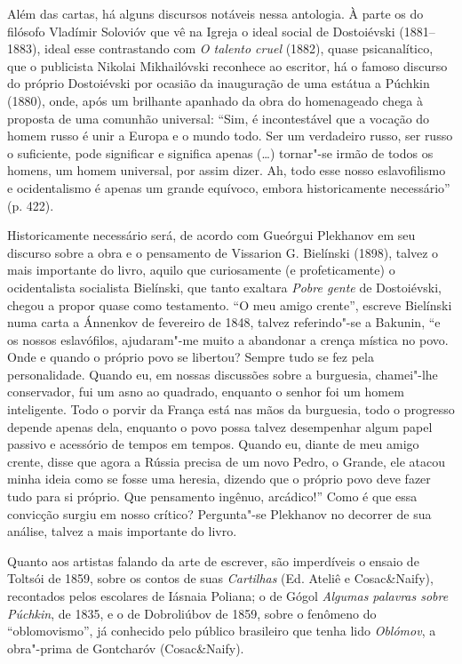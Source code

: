 Além das cartas, há alguns discursos notáveis nessa antologia. À parte
os do filósofo Vladímir Solovióv que vê na Igreja o ideal social de
Dostoiévski (1881--1883), ideal esse contrastando com \emph{O talento
cruel} (1882), quase psicanalítico, que o publicista Nikolai Mikhailóvski reconhece
ao escritor, há o famoso discurso do próprio Dostoiévski por ocasião da
inauguração de uma estátua a Púchkin (1880), onde, após um brilhante
apanhado da obra do homenageado chega à proposta de uma comunhão
universal: ``Sim, é incontestável que a vocação do homem russo é unir a
Europa e o mundo todo. Ser um verdadeiro russo, ser russo o suficiente,
pode significar e significa apenas (\ldots{}) tornar"-se irmão de todos os
homens, um homem universal, por assim dizer. Ah, todo esse nosso
eslavofilismo e ocidentalismo é apenas um grande equívoco, embora
historicamente necessário'' (p. 422).

Historicamente necessário será, de acordo com Gueórgui Plekhanov em seu
discurso sobre a obra e o pensamento de Vissarion G. Bielínski (1898),
talvez o mais importante do livro, aquilo que curiosamente (e
profeticamente) o ocidentalista socialista Bielínski, que tanto
exaltara \emph{Pobre gente} de Dostoiévski, chegou a propor quase como
testamento. ``O meu amigo crente'', escreve Bielínski numa carta a
Ánnenkov de fevereiro de 1848, talvez referindo"-se a Bakunin, ``e os
nossos eslavófilos, ajudaram"-me muito a abandonar a crença mística no
povo. Onde e quando o próprio povo se libertou? Sempre tudo se fez pela
personalidade. Quando eu, em nossas discussões sobre a burguesia,
chamei"-lhe conservador, fui um asno ao quadrado, enquanto o senhor foi
um homem inteligente. Todo o porvir da França está nas mãos da
burguesia, todo o progresso depende apenas dela, enquanto o povo possa
talvez desempenhar algum papel passivo e acessório de tempos em tempos.
Quando eu, diante de meu amigo crente, disse que agora a Rússia precisa
de um novo Pedro, o Grande, ele atacou minha ideia como se fosse uma
heresia, dizendo que o próprio povo deve fazer tudo para si próprio. Que
pensamento ingênuo, arcádico!'' Como é que essa convicção surgiu em
nosso crítico? Pergunta"-se Plekhanov no decorrer de sua
análise, talvez a mais importante do livro.

Quanto aos artistas falando da arte de escrever, são imperdíveis o
ensaio de Toltsói de 1859, sobre os contos de suas \emph{Cartilhas} (Ed.
Ateliê e Cosac\&Naify), recontados pelos escolares de Iásnaia Poliana; o
de Gógol \emph{Algumas palavras sobre Púchkin}, de 1835, e o de Dobroliúbov
de 1859, sobre o fenômeno do ``oblomovismo'', já conhecido pelo público
brasileiro que tenha lido \emph{Oblómov}, a obra"-prima de Gontcharóv
(Cosac\&Naify).

